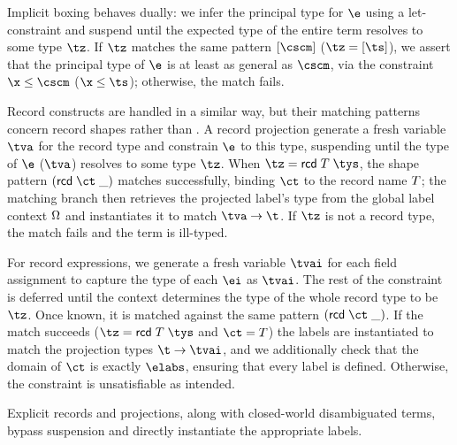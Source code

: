 \documentclass[acmsmall,screen,nonacm%
\Anonymous{,anonymous}{}%
\Final{}{,review}%
]{acmart}
\begin{document}
Implicit boxing behaves dually: we infer the principal type for $\e$ using a
let-constraint and suspend until the expected type of the entire term
resolves to some type $\tz$. If $\tz$ matches the same pattern $\cpatpoly
\cscm$ (\ie $\tz = \tpoly \ts$), we assert that the principal type of $\e$ is
at least as general as $\cscm$, via the constraint $\x \leq \cscm$ (\ie $\x
\leq \ts$); otherwise, the match fails.


Record constructs are handled in a similar way, but their matching patterns
concern record shapes rather than \polytypes. A record projection generate a
fresh variable $\tv$ for the record type and constrain $\e$ to this type,
suspending until the type of $\e$ ($\tv$) resolves to some type $\tz$. When
$\tz = \trcd \T \tys$, the shape pattern $(\cpatrcd \ct)$ matches successfully,
binding $\ct$ to the record name $T$; the matching branch then
retrieves the projected label's type from the global label context $\Omega$
and instantiates it to match $\tv \to \t$. If $\tz$ is not a
record type, the match fails and the term is ill-typed.

For record expressions, we generate a fresh variable $\tvi$ for each field
assignment to capture the type of each $\ei$ as $\tvi$. The rest of the
constraint is deferred until the context determines the type of the whole
record type to be $\tz$. Once known, it is matched against the same pattern
$\parens{\cpatrcd \ct}$. If the match succeeds (\ie $\tz = \trcd \T \tys$ and
$\ct = \T$) the labels are instantiated to match the projection types $\t \to
\tvi$, and we additionally check that the domain of $\ct$ is exactly $\elabs$,
ensuring that every label is defined. Otherwise, the constraint is
unsatisfiable as intended.

Explicit records and projections, along with closed-world disambiguated terms,
bypass suspension and directly instantiate the appropriate labels.
\end{document}

